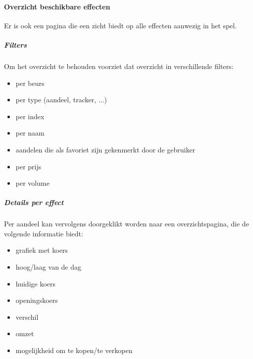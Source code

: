 \paragraph{Overzicht beschikbare effecten}
Er is ook een pagina die een zicht biedt op alle effecten aanwezig in het spel.
\subparagraph{Filters} Om het overzicht te behouden voorziet dat overzicht in verschillende filters:
\begin{itemize}
  \setlength{\itemsep}{1pt}
  \setlength{\parskip}{0pt}
  \setlength{\parsep}{0pt}
	\item{per beurs}
	\item{per type (aandeel, tracker, ...)}
	\item{per index}
	\item{per naam}
	\item{aandelen die als favoriet zijn gekenmerkt door de gebruiker}
	\item{per prijs}
	\item{per volume}
\end{itemize}
\subparagraph{Details per effect}Per aandeel kan vervolgens doorgeklikt worden naar een overzichtspagina, die de volgende informatie biedt:
\begin{itemize}
  \setlength{\itemsep}{1pt}
  \setlength{\parskip}{0pt}
  \setlength{\parsep}{0pt}
	\item{grafiek met koers}
	\item{hoog/laag van de dag}
	\item{huidige koers}
	\item{openingskoers}
	\item{verschil}
	\item{omzet}
	\item{mogelijkheid om te kopen/te verkopen}
\end{itemize}

